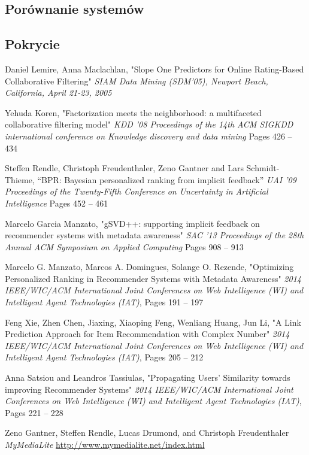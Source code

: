 \documentclass{pracamgr}
\begin{document}
   \subsection{Porównanie systemów}
   
   
   
   \subsection{Pokrycie}
    
    
    
\begin{thebibliography}{99}%
  
   Daniel Lemire, Anna Maclachlan,
  "Slope One Predictors for Online Rating-Based Collaborative Filtering"
  \textit{SIAM Data Mining (SDM'05), Newport Beach, California, April 21-23, 2005}  
  
   Yehuda Koren,
  "Factorization meets the neighborhood: a multifaceted collaborative filtering model"
  \textit{KDD '08 Proceedings of the 14th ACM SIGKDD international conference on Knowledge discovery and data mining}
  Pages 426 -- 434 
  
   Steffen Rendle, Christoph Freudenthaler, Zeno Gantner and Lars Schmidt-Thieme,
  “BPR: Bayesian personalized ranking from implicit feedback”
  \textit{UAI '09 Proceedings of the Twenty-Fifth Conference on Uncertainty in Artificial Intelligence}
  Pages 452 -- 461
  
   Marcelo Garcia Manzato,
  "gSVD++: supporting implicit feedback on recommender systems with metadata awareness"
  \textit{SAC '13 Proceedings of the 28th Annual ACM Symposium on Applied Computing}
  Pages 908 -- 913

   Marcelo G. Manzato, Marcos A. Domingues, Solange O. Rezende,
  "Optimizing Personalized Ranking in Recommender Systems with Metadata Awareness"
  \textit{2014 IEEE/WIC/ACM International Joint Conferences on Web Intelligence (WI) and Intelligent Agent Technologies (IAT)},
  Pages 191 -- 197
  
   Feng Xie, Zhen Chen, Jiaxing, Xiaoping Feng, Wenliang Huang, Jun Li,
  "A Link Prediction Approach for Item Recommendation with Complex Number"
  \textit{2014 IEEE/WIC/ACM International Joint Conferences on Web Intelligence (WI) and Intelligent Agent Technologies (IAT)},
  Pages 205 -- 212

   Anna Satsiou and Leandros Tassiulas,
  "Propagating Users’ Similarity towards improving Recommender Systems"
  \textit{2014 IEEE/WIC/ACM International Joint Conferences on Web Intelligence (WI) and Intelligent Agent Technologies (IAT)},
  Pages 221 -- 228

   Zeno Gantner, Steffen Rendle, Lucas Drumond, and Christoph Freudenthaler
  \textit{MyMediaLite}
  \url{http://www.mymedialite.net/index.html}

\end{thebibliography}
\end{document}
